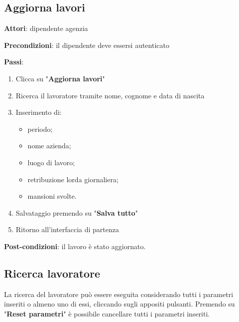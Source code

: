\documentclass{article}
\begin{document}
    \subsection{Aggiorna lavori}

    \begin{framed}
        \item[] \textbf{Attori}: dipendente agenzia
            \item[] \textbf{Precondizioni}: il dipendente deve essersi autenticato
            \item[] \textbf{Passi}: \begin{enumerate}
                \item Clicca su "\textbf{Aggiorna lavori}"
                \item Ricerca il lavoratore tramite nome, cognome e data di nascita
                \item Inserimento di:
                \begin{itemize}
                    \item periodo;
                    \item nome azienda;
                    \item luogo di lavoro;
                    \item retribuzione lorda giornaliera;
                    \item mansioni svolte.
                \end{itemize}
                \item Salvataggio premendo su "\textbf{Salva tutto}"
                \item Ritorno all'interfaccia di partenza
            \end{enumerate}
            \item[] \textbf{Post-condizioni}: il lavoro è stato aggiornato.
    \end{framed}

    

    \subsection{Ricerca lavoratore}

    La ricerca del lavoratore può essere eseguita considerando tutti i parametri inseriti o almeno uno di essi, cliccando sugli appositi pulsanti. Premendo su "\textbf{Reset parametri}" è possibile cancellare tutti i parametri inseriti.
\end{document}
